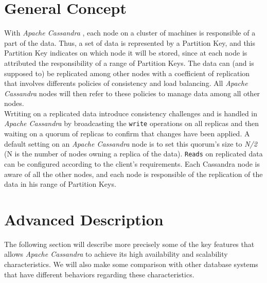 \documentclass[a4paper]{report}
\newcommand{\ca}{\emph{Apache Cassandra }}
\begin{document}
\section{General Concept}
With \ca, each node on a cluster of machines is responsible of a part of the data. Thus, a set of data is represented by a Partition Key, and this Partition Key indicates on which node it will be stored, since at each node is attributed the responsibility of a range of Partition Keys. The data can (and is supposed to) be replicated among other nodes with a coefficient of replication that involves differents policies of consistency and load balancing. All \ca nodes will then refer to these policies to manage data among all other nodes.\\
Wrtiting on a replicated data introduce consistency challenges and is handled in \ca by broadcasting the \verb;write; operations on all replicas and then waiting on a quorum of replicas to confirm that changes have been applied. A default setting on an \ca node is to set this quorum's size to \emph{N/2} (N is the number of nodes owning a replica of the data). \verb;Reads; on replicated data can be configured according to the client's requirements. Each Cassandra node is aware of all the other nodes, and each node is responsible of the replication of the data in his range of Partition Keys.

\section{Advanced Description}
The following section will describe more precisely some of the key features that allows \ca to achieve its high availability and scalability characteristics. We will also make some comparison with other database systems that have different behaviors regarding these characteristics.
\end{document}
